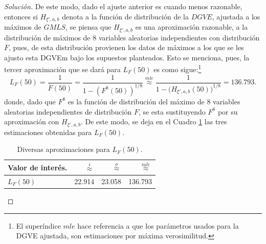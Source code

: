 \documentclass[10.5pt,notitlepage]{article}
\newenvironment{solucion}
  {\begin{proof}[Solución]}
  {\end{proof}}
\newcommand{\approxi}{\overset{i}{\approx}}
\theoremstyle{plain}
\begin{document}
\begin{solucion}
De este modo, dado el ajuste anterior es cuando menos razonable, entonces si \(H_{\xi',a,b}\) denota a la función de distribución de la \(DGVE\), ajustada a los máximos de \(GMLS\), se piensa que \(H_{\xi',a,b}\) es una aproximación razonable, a la distribución de máximos de \(8\) variables aleatorias independientes con distribución \(F\), pues, de esta distribución provienen los datos de  máximos a los que se les ajusto esta DGVEm bajo los supuestos planteados. Esto se menciona, pues, la tercer aproximación que se dará para \(L_{F}(50)\) es como sigue:\footnote{El superíndice \(mle\) hace referencia a que los parámetros usados para la DGVE ajustada, son estimaciones por máxima verosimilitud.} 
\[
L_{F}(50) = \frac{1}{\overline{F}(50)} = \frac{1}{1 - (F^{8}(50))^{1/8}} \overset{mle}{\approx} \frac{1}{1 - ({H_{\xi',a,b}(50))^{1/8}} }=  136.793.
\]
donde, dado que \(F^{8}\) es la función de distribución del máximo de \(8\) variables aleatorias independientes de distribución \(F\), se esta sustituyendo \(F^{8}\) por su aproximación con \(H_{\xi',a,b}\). De este modo, se deja en el Cuadro \ref{tab:1} las tres estimaciones obtenidas para \(L_{F}(50)\).
\begin{table}[H]
        \centering
        \begin{tabular}{@{}l@{\hskip 0.3in}r@{\hskip 0.3in}r@{\hskip 0.3in}r@{}}
        \toprule
         Valor de interés. & \(\approxi\) & \(\overset{o}{\approx}\) & \(\overset{mle}{\approx}\)\\
        \midrule         
        \(L_{F}(50)\)&22.914& 23.058 &136.793\\
        \end{tabular}
        \caption{Diversas aproximaciones para \(L_{F}(50)\).}
        \label{tab:1}
\end{table}

\end{solucion}
\end{document}
